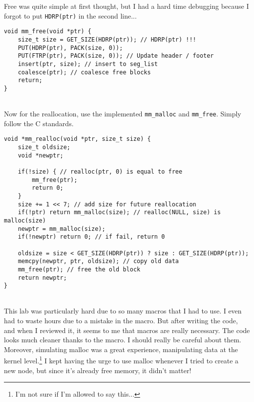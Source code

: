 \documentclass[12pt]{report}
\begin{document}
Free was quite simple at first thought, but I had a hard time debugging because I forgot to put \texttt{HDRP(ptr)} in the second line...
\begin{lstlisting}[style=Cstyle]
void mm_free(void *ptr) {
	size_t size = GET_SIZE(HDRP(ptr)); // HDRP(ptr) !!!
	PUT(HDRP(ptr), PACK(size, 0));
	PUT(FTRP(ptr), PACK(size, 0)); // Update header / footer
	insert(ptr, size); // insert to seg_list
	coalesce(ptr); // coalesce free blocks
	return;
}
\end{lstlisting}~\\
Now for the reallocation, use the implemented \texttt{mm\_malloc} and \texttt{mm\_free}. Simply follow the C standards.
\begin{lstlisting}[style=Cstyle]
void *mm_realloc(void *ptr, size_t size) {
	size_t oldsize;
	void *newptr;
	
	if(!size) { // realloc(ptr, 0) is equal to free
		mm_free(ptr);
		return 0;
	}
	size += 1 << 7; // add size for future reallocation
	if(!ptr) return mm_malloc(size); // realloc(NULL, size) is malloc(size)
	newptr = mm_malloc(size);
	if(!newptr) return 0; // if fail, return 0
	
	oldsize = size < GET_SIZE(HDRP(ptr)) ? size : GET_SIZE(HDRP(ptr));
	memcpy(newptr, ptr, oldsize); // copy old data
	mm_free(ptr); // free the old block
	return newptr;
}
\end{lstlisting}~\\
This lab was particularly hard due to so many macros that I had to use. I even had to waste hours due to a mistake in the macro. But after writing the code, and when I reviewed it, it seems to me that macros are really necessary. The code looks much cleaner thanks to the macro. I should really be careful about them. Moreover, simulating malloc was a great experience, manipulating data at the kernel level.\footnote{I'm not sure if I'm allowed to say this...} I kept having the urge to use malloc whenever I tried to create a new node, but since it's already free memory, it didn't matter!
\end{document}
